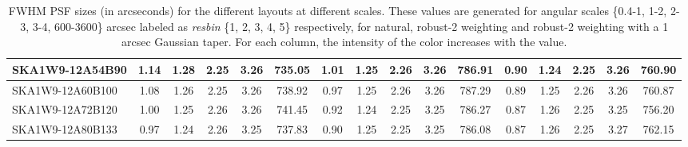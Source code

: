 \begin{table}[H]
{{\begin{tabular}{|lccccc||ccccc||ccccc|}
SKA1W9-12A54B90 & 1.14 \cellcolor{blue!60.00} & 1.28 \cellcolor{red!44.26} & 2.25 \cellcolor{green!18.00} & 3.26 \cellcolor{orange!51.37} & 735.05 \cellcolor{purple!18.00} & 1.01 \cellcolor{blue!60.00} & 1.25 \cellcolor{red!23.29} & 2.26 \cellcolor{green!40.29} & 3.26 \cellcolor{orange!55.70} & 786.91 \cellcolor{purple!30.51} & 0.90 \cellcolor{blue!43.92} & 1.24 \cellcolor{red!18.00} & 2.25 \cellcolor{green!37.16} & 3.26 \cellcolor{orange!30.99} & 760.90 \cellcolor{purple!51.16}\\ \hline 
SKA1W9-12A60B100 & 1.08 \cellcolor{blue!45.13} & 1.26 \cellcolor{red!27.99} & 2.25 \cellcolor{green!24.68} & 3.26 \cellcolor{orange!44.60} & 738.92 \cellcolor{purple!37.66} & 0.97 \cellcolor{blue!45.35} & 1.25 \cellcolor{red!20.11} & 2.26 \cellcolor{green!50.57} & 3.26 \cellcolor{orange!60.00} & 787.29 \cellcolor{purple!36.28} & 0.89 \cellcolor{blue!32.66} & 1.25 \cellcolor{red!28.80} & 2.26 \cellcolor{green!53.74} & 3.26 \cellcolor{orange!26.35} & 760.87 \cellcolor{purple!50.99}\\ \hline 
SKA1W9-12A72B120 & 1.00 \cellcolor{blue!27.05} & 1.25 \cellcolor{red!19.24} & 2.26 \cellcolor{green!59.52} & 3.26 \cellcolor{orange!49.50} & 741.45 \cellcolor{purple!50.58} & 0.92 \cellcolor{blue!26.50} & 1.24 \cellcolor{red!18.00} & 2.25 \cellcolor{green!26.57} & 3.25 \cellcolor{orange!28.02} & 786.27 \cellcolor{purple!20.84} & 0.87 \cellcolor{blue!20.99} & 1.26 \cellcolor{red!40.01} & 2.25 \cellcolor{green!18.00} & 3.25 \cellcolor{orange!18.00} & 756.20 \cellcolor{purple!18.00}\\ \hline 
SKA1W9-12A80B133 & 0.97 \cellcolor{blue!18.00} & 1.24 \cellcolor{red!18.00} & 2.26 \cellcolor{green!39.95} & 3.25 \cellcolor{orange!18.00} & 737.83 \cellcolor{purple!32.15} & 0.90 \cellcolor{blue!18.00} & 1.25 \cellcolor{red!26.75} & 2.25 \cellcolor{green!18.00} & 3.25 \cellcolor{orange!18.00} & 786.08 \cellcolor{purple!18.00} & 0.87 \cellcolor{blue!18.00} & 1.26 \cellcolor{red!42.98} & 2.25 \cellcolor{green!34.95} & 3.27 \cellcolor{orange!60.00} & 762.15 \cellcolor{purple!60.00}\\ \hline 
\end{tabular}}
\vspace{-0.300000cm}
\hspace{1cm} 

\vspace{.50cm}
\caption{FWHM PSF sizes (in arcseconds) for the different layouts at different scales. These values are generated for angular scales \{0.4-1, 1-2, 2-3, 3-4, 600-3600\} arcsec labeled as {\it resbin} \{1, 2, 3, 4, 5\} respectively, for natural, robust-2 weighting and robust-2 weighting with a 1 arcsec Gaussian taper. For each column, the intensity of the color increases with the value.}\label{tab:psf_mean}}
 \end{table}
